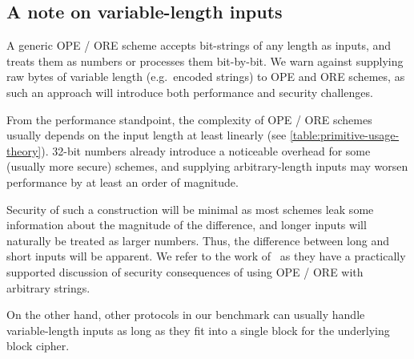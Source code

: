 	\subsection{A note on variable-length inputs}\label{section:range-snapshot:variable-inputs}

		A generic OPE / ORE scheme accepts bit-strings of any length as inputs, and treats them as numbers or processes them bit-by-bit.
		We warn against supplying raw bytes of variable length (e.g.\ encoded strings) to OPE and ORE schemes, as such an approach will introduce both performance and security challenges.

		From the performance standpoint, the complexity of OPE / ORE schemes usually depends on the input length at least linearly (see \cref{table:primitive-usage-theory}).
		32-bit numbers already introduce a noticeable overhead for some (usually more secure) schemes, and supplying arbitrary-length inputs may worsen performance by at least an order of magnitude.

		Security of such a construction will be minimal as most schemes leak some information about the magnitude of the difference, and longer inputs will naturally be treated as larger numbers.
		Thus, the difference between long and short inputs will be apparent.
		We refer to the work of~\textcite{leakage-abuse-grubs-2017} as they have a practically supported discussion of security consequences of using OPE / ORE with arbitrary strings.

		On the other hand, other protocols in our benchmark can usually handle variable-length inputs as long as they fit into a single block for the underlying block cipher.
